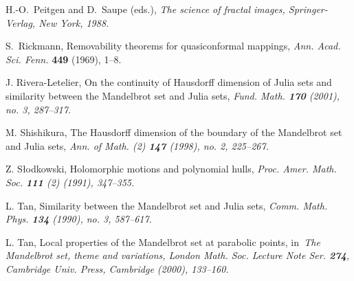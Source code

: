 \documentclass[12pt, reqno, a4paper]{amsart}
\theoremstyle{plain}
\theoremstyle{definition}
\begin{document}
\begin{thebibliography}{99}
H.-O.~Peitgen and D.~Saupe (eds.), 
\it The science of fractal images\rm, 
Springer-Verlag, New York, 1988.



S.~Rickmann,
Removability theorems for quasiconformal mappings, 
{\it Ann. Acad. Sci. Fenn. } {\bf 449} (1969), 
1--8.

J. Rivera-Letelier, On the continuity of Hausdorff dimension of Julia sets and 
similarity between the Mandelbrot set and Julia sets, \it Fund. Math. \rm 
{\bf 170} (2001), no. 3, 287--317.


M. Shishikura, 
The Hausdorff dimension of the boundary of the Mandelbrot set and Julia sets,
\it Ann. of Math. \rm (2) {\bf 147} (1998), no. 2, 225--267.


Z. S\l odkowski, 
{\rm Holomorphic motions and polynomial hulls}, \it
Proc. Amer. Math. Soc. {\bf 111} \rm (2) (1991), 347--355.


L. Tan, 
Similarity between the Mandelbrot set and Julia sets, 
\it Comm. Math. Phys. 
{\bf 134} \rm (1990), no. 3, 587--617.


L. Tan, 
Local properties of the Mandelbrot set at parabolic points,
in\it \ The Mandelbrot set, theme and variations\rm, London Math. Soc. Lecture 
Note Ser. {\bf 274}, Cambridge Univ. Press, Cambridge (2000), 133--160.


\end{thebibliography}
\end{document}
